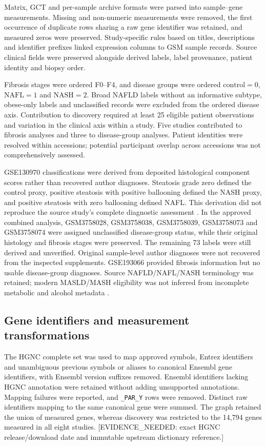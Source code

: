 \documentclass[11pt,a4paper]{article}
\begin{document}
Matrix, GCT and per-sample archive formats were parsed into sample–gene measurements. Missing and non-numeric measurements were removed, the first occurrence of duplicate rows sharing a raw gene identifier was retained, and measured zeros were preserved. Study-specific rules based on titles, descriptions and identifier prefixes linked expression columns to GSM sample records. Source clinical fields were preserved alongside derived labels, label provenance, patient identity and biopsy order.

Fibrosis stages were ordered F0–F4, and disease groups were ordered \(\mathrm{control}=0\), \(\mathrm{NAFL}=1\) and \(\mathrm{NASH}=2\). Broad NAFLD labels without an informative subtype, obese-only labels and unclassified records were excluded from the ordered disease axis. Contribution to discovery required at least 25 eligible patient observations and variation in the clinical axis within a study. Five studies contributed to fibrosis analyses and three to disease-group analyses. Patient identities were resolved within accessions; potential participant overlap across accessions was not comprehensively assessed.

GSE130970 classifications were derived from deposited histological component scores rather than recovered author diagnoses. Steatosis grade zero defined the control proxy, positive steatosis with positive ballooning defined the NASH proxy, and positive steatosis with zero ballooning defined NAFL. This derivation did not reproduce the source study's complete diagnostic assessment \cite{ref4}. In the approved combined analysis, GSM3758028, GSM3758038, GSM3758039, GSM3758073 and GSM3758074 were assigned unclassified disease-group status, while their original histology and fibrosis stages were preserved. The remaining 73 labels were still derived and unverified. Original sample-level author diagnoses were not recovered from the inspected supplements. GSE193066 provided fibrosis information but no usable disease-group diagnoses. Source NAFLD/NAFL/NASH terminology was retained; modern MASLD/MASH eligibility was not inferred from incomplete metabolic and alcohol metadata \cite{ref3}.

\subsection*{Gene identifiers and measurement transformations}
The HGNC complete set was used to map approved symbols, Entrez identifiers and unambiguous previous symbols or aliases to canonical Ensembl gene identifiers, with Ensembl version suffixes removed. Ensembl identifiers lacking HGNC annotation were retained without adding unsupported annotations. Mapping failures were reported, and \texttt{\_PAR\_Y} rows were removed. Distinct raw identifiers mapping to the same canonical gene were summed. The graph retained the union of measured genes, whereas discovery was restricted to the 14,794 genes measured in all eight studies. [EVIDENCE\_NEEDED: exact HGNC release/download date and immutable upstream dictionary reference.]
\end{document}
